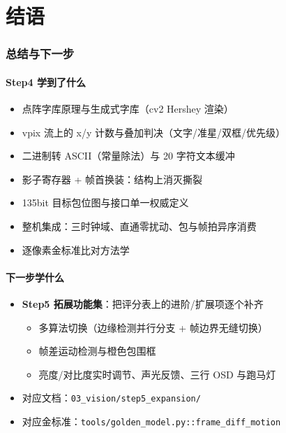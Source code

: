 \documentclass[11pt]{ctexart}
\newcommand{\code}[1]{\texttt{#1}}
\begin{document}


\part*{结语}
\clearpage
\section*{总结与下一步}

\subsection*{Step4 学到了什么}
\begin{itemize}
  \item 点阵字库原理与生成式字库（cv2 Hershey 渲染）
  \item vpix 流上的 x/y 计数与叠加判决（文字/准星/双框/优先级）
  \item 二进制转 ASCII（常量除法）与 20 字符文本缓冲
  \item 影子寄存器 + 帧首换装：结构上消灭撕裂
  \item 135bit 目标包位图与接口单一权威定义
  \item 整机集成：三时钟域、直通零扰动、包与帧拍异序消费
  \item 逐像素金标准比对方法学
\end{itemize}

\subsection*{下一步学什么}
\begin{itemize}
  \item \textbf{Step5 拓展功能集}：把评分表上的进阶/扩展项逐个补齐
  \begin{itemize}
    \item 多算法切换（边缘检测并行分支 + 帧边界无缝切换）
    \item 帧差运动检测与橙色包围框
    \item 亮度/对比度实时调节、声光反馈、三行 OSD 与跑马灯
  \end{itemize}
  \item 对应文档：\code{03\_vision/step5\_expansion/}
  \item 对应金标准：\code{tools/golden\_model.py::frame\_diff\_motion}
\end{itemize}
\end{document}
